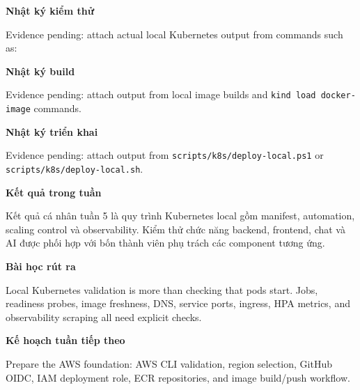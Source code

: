 \vspace{0.5em}\noindent\textbf{Nhật ký kiểm
thử}\par

Evidence pending: attach actual local Kubernetes output from commands
such as:

\begin{Shaded}
\begin{Highlighting}[]
\end{Highlighting}
\end{Shaded}

\vspace{0.5em}\noindent\textbf{Nhật ký build}\par

Evidence pending: attach output from local image builds and
\texttt{kind\ load\ docker-\allowbreak{}image} commands.

\vspace{0.5em}\noindent\textbf{Nhật ký triển
khai}\par

Evidence pending: attach output from
\texttt{scripts/\allowbreak{}k8s/\allowbreak{}deploy-\allowbreak{}local.\allowbreak{}ps1} or
\texttt{scripts/\allowbreak{}k8s/\allowbreak{}deploy-\allowbreak{}local.\allowbreak{}sh}.

\vspace{0.5em}\noindent\textbf{Kết quả trong tuần}\par

Kết quả cá nhân tuần 5 là quy trình Kubernetes local gồm manifest,
automation, scaling control và observability. Kiểm thử chức năng
backend, frontend, chat và AI được phối hợp với bốn thành viên phụ trách
các component tương ứng.

\vspace{0.5em}\noindent\textbf{Bài học rút ra}\par

Local Kubernetes validation is more than checking that pods start. Jobs,
readiness probes, image freshness, DNS, service ports, ingress, HPA
metrics, and observability scraping all need explicit checks.

\vspace{0.5em}\noindent\textbf{Kế hoạch tuần tiếp
theo}\par

Prepare the AWS foundation: AWS CLI validation, region selection, GitHub
OIDC, IAM deployment role, ECR repositories, and image build/push
workflow.

